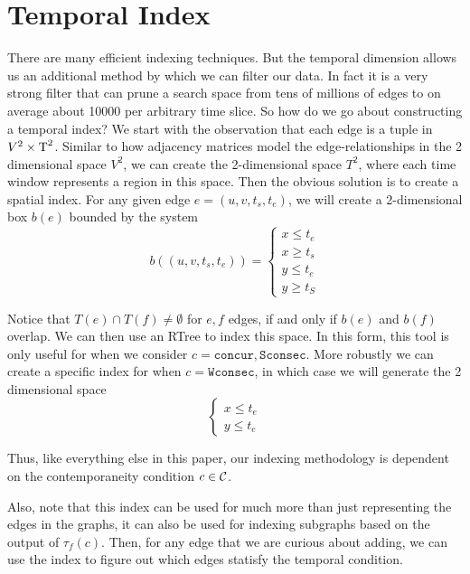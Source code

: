 \section{Temporal Index}

There are many efficient indexing techniques. But the temporal dimension allows
us an additional method by which we can filter our data. In fact it is a very
strong filter that can prune a search space from tens of millions of edges to on
average about 10000 per arbitrary time slice. So how do we go about constructing
a temporal index?  We start with the observation that each edge is a tuple in
$V^2 \times \text{T}^2$. Similar to how adjacency matrices model the
edge-relationships in the 2 dimensional space $V^2$, we can create the
2-dimensional space $T^2$, where each time window represents a region in this
space. Then the obvious solution is to create a spatial index. For any given
edge $e = (u,v, t_s, t_e)$, we will create a 2-dimensional box $b(e)$ bounded by
the system
\[b((u,v, t_s, t_e)) =
  \begin{cases}
    x \leq t_e \\
    x \geq t_s \\
    y \leq t_e \\
    y \geq t_S
  \end{cases}
\]

Notice that $T(e) \cap T(f) \neq \emptyset$ for $e,f$ edges, if and only if
$b(e)$ and $b(f)$ overlap. We can then use an RTree \cite{1984-SIGMOD-RTree} to
index this space. In this form, this tool is only useful for when we consider $c
= \texttt{concur}, \texttt{Sconsec}$.  More robustly we can create a specific
index for when $c = \texttt{Wconsec}$, in which case we will generate the 2
dimensional space
\[ \begin{cases}
     x \leq t_e \\
     y \leq t_e
   \end{cases}
\]

Thus, like everything else in this paper, our indexing methodology is dependent
on the contemporaneity condition $c \in \mathcal{C}$. 

Also, note that this index can be used for much more than just representing the
edges in the graphs, it can also be used for indexing subgraphs based on the output
of $\tau_f(c)$.  Then, for any edge that we are curious about adding, we can use
the index to figure out which edges statisfy the temporal condition.

  
